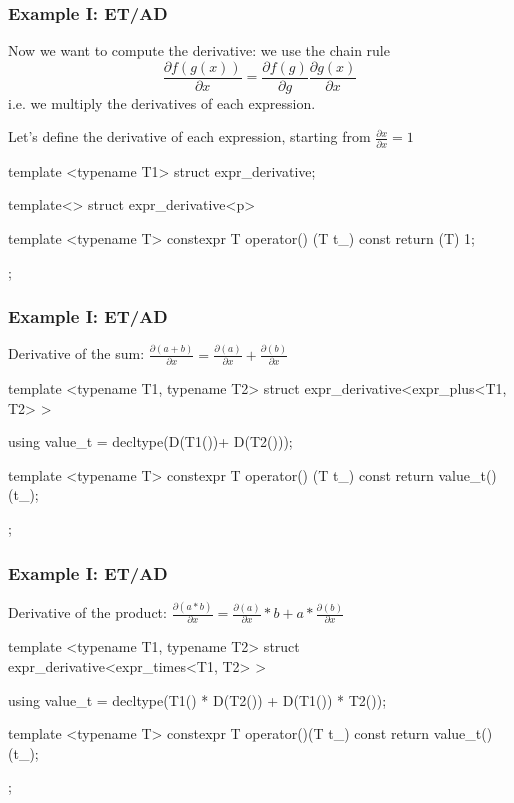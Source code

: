 \documentclass[aspectratio=43]{beamer}
\begin{document}
\begin{frame}[fragile]\frametitle{Example I: ET/AD}
  Now we want to compute the derivative: we use the \alert{chain rule}
  $$
  \frac{\partial f(g(x))}{\partial x}=\frac{\partial f(g)}{\partial g}\frac{\partial g(x)}{\partial x}
  $$
  i.e. we multiply the derivatives of each expression.

  Let's define the derivative of each expression, starting from $\frac{\partial x}{\partial x}=1$
  \begin{Cpplisting}[: x derivative]{}
template <typename T1>
struct expr_derivative;

template<>
struct expr_derivative<p>{

  template <typename T>
  constexpr T operator() (T t_) const{
    return (T) 1;
  }
};
  \end{Cpplisting}
\end{frame}

\begin{frame}[fragile]\frametitle{Example I: ET/AD}
  Derivative of the sum: $\frac{\partial (a+b)}{\partial x}=\frac{\partial (a)}{\partial x}+\frac{\partial (b)}{\partial x}$
  \begin{Cpplisting}{}
template <typename T1, typename T2>
struct expr_derivative<expr_plus<T1, T2> >{
    using value_t = decltype(D(T1())+ D(T2()));

    template <typename T>
    constexpr T operator() (T t_) const{
        return value_t()(t_);
    }
};
  \end{Cpplisting}
\end{frame}

\begin{frame}[fragile]\frametitle{Example I: ET/AD}
  Derivative of the product: $\frac{\partial (a*b)}{\partial x}=\frac{\partial (a)}{\partial x}*b+a*\frac{\partial (b)}{\partial x}$
  \begin{Cpplisting}{}

template <typename T1, typename T2>
struct expr_derivative<expr_times<T1, T2> >{

    using value_t = decltype(T1() * D(T2())
                             +
                             D(T1()) * T2());

    template <typename T>
    constexpr T operator()(T t_)  const{
        return value_t()(t_);
    }
};
  \end{Cpplisting}
\end{frame}
\end{document}
